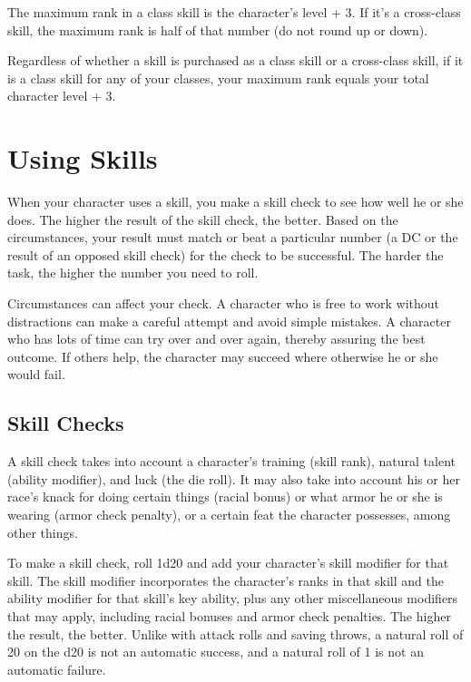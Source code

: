 The maximum rank in a class skill is the character's level + 3. If it's a cross-class 
skill, the maximum rank is half of that number (do not round up or down).

Regardless of whether a skill is purchased as a class skill or a cross-class skill, 
if it is a class skill for any of your classes, your maximum rank equals your total 
character level + 3.

\section{Using Skills}

When your character uses a skill, you make a skill check to see how well he or 
she does. The higher the result of the skill check, the better. Based on the circumstances, 
your result must match or beat a particular number (a DC or the result of an opposed 
skill check) for the check to be successful. The harder the task, the higher the 
number you need to roll.

Circumstances can affect your check. A character who is free to work without distractions 
can make a careful attempt and avoid simple mistakes. A character who has lots 
of time can try over and over again, thereby assuring the best outcome. If others 
help, the character may succeed where otherwise he or she would fail.

\subsection{Skill Checks}

A skill check takes into account a character's training (skill rank), natural talent 
(ability modifier), and luck (the die roll). It may also take into account his 
or her race's knack for doing certain things (racial bonus) or what armor he or 
she is wearing (armor check penalty), or a certain feat the character possesses, 
among other things. 

To make a skill check, roll 1d20 and add your character's skill modifier for that 
skill. The skill modifier incorporates the character's ranks in that skill and 
the ability modifier for that skill's key ability, plus any other miscellaneous 
modifiers that may apply, including racial bonuses and armor check penalties. The 
higher the result, the better. Unlike with attack rolls and saving throws, a natural 
roll of 20 on the d20 is not an automatic success, and a natural roll of 1 is not 
an automatic failure.

